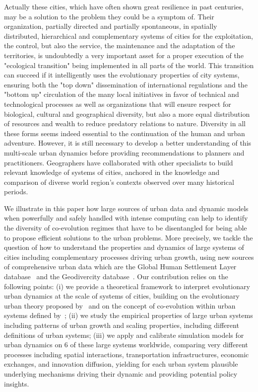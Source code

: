\documentclass[11pt]{article}
\begin{document}
Actually these cities, which have often shown great resilience in past centuries, may be a solution to the problem they could be a symptom of. Their organization, partially directed and partially spontaneous, in spatially distributed, hierarchical and complementary systems of cities for the exploitation, the control, but also the service, the maintenance and the adaptation of the territories, is undoubtedly a very important asset for a proper execution of the "ecological transition" being implemented in all parts of the world. This transition can succeed if it intelligently uses the evolutionary properties of city systems, ensuring both the "top down" dissemination of international regulations and the "bottom up" circulation of the many local initiatives in favor of technical and technological processes as well as organizations that will ensure respect for biological, cultural and geographical diversity, but also a more equal distribution of resources and wealth to reduce predatory relations to nature. Diversity in all these forms seems indeed essential to the continuation of the human and urban adventure. However, it is still necessary to develop a better understanding of this multi-scale urban dynamics before providing recommendations to planners and practitioners.  Geographers have collaborated with other specialists to build relevant knowledge of systems of cities, anchored in the knowledge and comparison of diverse world region’s contexts observed over many historical periods.

We illustrate in this paper how large sources of urban data and dynamic models when powerfully and safely handled with intense computing can help to identify the diversity of co-evolution regimes that have to be disentangled for being able to propose efficient solutions to the urban problems. More precisely, we tackle the question of how to understand the properties and dynamics of large systems of cities including complementary processes driving urban growth, using new sources of comprehensive urban data which are the Global Human Settlement Layer database~\cite{florczyk2019ghsl} and the Geodivercity database~\cite{pumain2015multilevel}. Our contribution relies on the following points: (i) we provide a theoretical framework to interpret evolutionary urban dynamics at the scale of systems of cities, building on the evolutionary urban theory proposed by~\cite{pumain2018evolutionary} and on the concept of co-evolution within urban systems defined by~\cite{raimbault2018caracterisation}; (ii) we study the empirical properties of large urban systems including patterns of urban growth and scaling properties, including different definitions of urban systems; (iii) we apply and calibrate simulation models for urban dynamics on 6 of these large systems worldwide, comparing very different processes including spatial interactions, transportation infrastructures, economic exchanges, and innovation diffusion, yielding for each urban system plausible underlying  mechanisms  driving their dynamic and providing potential policy insights.
\end{document}

